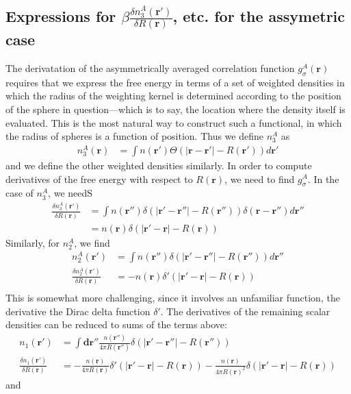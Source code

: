 \documentclass[letterpaper,twocolumn,amsmath,amssymb,jcp,10pt,aip]{revtex4-1}
\newcommand{\rr}{\textbf{r}}
\begin{document}
\begin{widetext}
\subsection{Expressions for $\beta\frac{\delta n_3^{A}(\mathbf{r}')}{\delta R(\mathbf{r})}$, etc. for the assymetric case}\label{appendix:g-A}

The derivatation of the asymmetrically averaged correlation function
$g_\sigma^A(\rr)$ requires that we express the free energy in terms of
a set of weighted densities in which the radius of the weighting
kernel is determined according to the position of the sphere in
question---which is to say, the location where the density itself is
evaluated.  This is the most natural way to construct such a
functional, in which the radius of spheres is a function of position.
Thus we define $n_3^A$ as
\begin{align}
  n_3^{A}(\rr) &= \int n(\rr') \Theta(\left|\rr - \rr'\right| -R(\rr')) d\rr'
\end{align}
and we define the other weighted densities similarly.  In order to
compute derivatives of the free energy with respect to $R(\rr)$, we
need to find $g_\sigma^A$.  In the case of $n_3^A$, we needS
\begin{align}
  \frac{\delta n_3^{A} (\rr')}{\delta R(\rr)} &=
  \int n (\rr'') \delta(|\rr' - \rr''| - R(\rr'')) \delta(\rr-\rr'') d\rr'' \\
   &= n (\rr) \delta(|\rr' - \rr| - R(\rr))
\end{align}
Similarly, for $n_2^A$, we find
\begin{align}
  n_2^{A}(\rr') &= \int n(\rr'') \delta(|\rr' - \rr''| - R(\rr'')) d \rr''\\
  \frac{\delta n_2^{A}(\rr')}{\delta R(\rr)} &= -n(\rr) \delta'(|\rr' - \rr| - R(\rr))\\
\end{align}
This is somewhat more challenging, since it involves an unfamiliar
function, the derivative the Dirac delta function $\delta'$.
%
The derivatives of the remaining scalar densities can be reduced to
sums of the terms above:
\begin{align}
  n_1(\rr') &= \int \mathbf{dr''} \frac{n(\rr'')}{4\pi R(\rr'')}
  \delta(|\rr'-\rr''| - R(\rr'')) \\
  \frac{\delta n_1(\rr')}{\delta R(\rr)}
  &= -\frac{n(\rr)}{4\pi
    R(\rr)}\delta'(|\rr'-\rr| - R(\rr))
  -
  \frac{n(\rr)}{4\pi
    R(\rr)^2}\delta(|\rr'-\rr| - R(\rr))
\end{align}
and
\begin{align}

\end{align}
\end{widetext}
\end{document}
